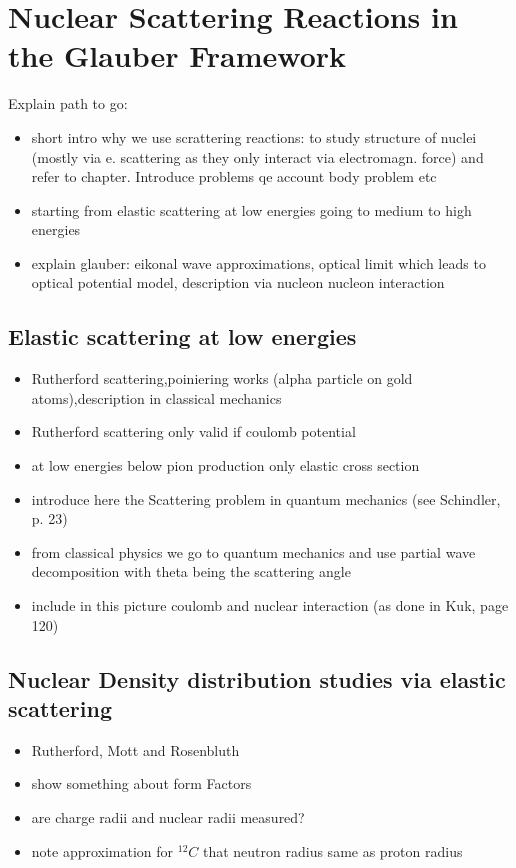 \section{Nuclear Scattering Reactions in the Glauber Framework}
Explain path to go:
\begin{itemize}
\item short intro why we use scrattering reactions: to study structure of nuclei (mostly via e. scattering as they only interact via electromagn. force) and refer to chapter. Introduce problems qe account body problem etc
\item starting from elastic scattering at low energies going to medium to high energies
\item explain glauber: eikonal wave approximations, optical limit which leads to optical potential model, description via nucleon nucleon interaction
\end{itemize}
\subsection{Elastic scattering at low energies}
\begin{itemize}
\item Rutherford scattering,poiniering works (alpha particle on gold atoms),description in classical mechanics
\item Rutherford scattering only valid if coulomb potential
\item at low energies below pion production only elastic cross section
\item introduce here the Scattering problem in quantum mechanics (see Schindler, p. 23)
\item from classical physics we go to quantum mechanics and use partial wave decomposition with theta being the scattering angle
\item include in this picture coulomb and nuclear interaction (as done in Kuk, page 120)
\end{itemize}
\subsection{Nuclear Density distribution studies via elastic scattering}
\begin{itemize}
\item Rutherford, Mott and Rosenbluth
\item  show something about form Factors
\item  are charge radii and nuclear radii measured?
\item note approximation for $^{12}C$ that neutron radius same as proton radius
\end{itemize}
